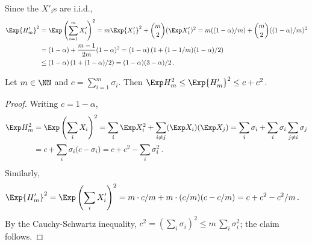 


  Since the $X'_i$s are i.i.d., 
  \begin{align*}
    \Exp {H'_m}^2 
    &= \Exp \left(\sum_{i = 1}^m X'_i \right)^2
    = m \Exp {X'_1}^2 + \binom{m}{2} (\Exp X'_1)^2
    = m ((1-\alpha)/m) + \binom{m}{2} ((1 - \alpha)/m)^2 \\
    &= (1-\alpha) + \frac{m-1}{2m} (1 - \alpha)^2
    = (1-\alpha) \left( 1 + (1 - 1/m) (1 - \alpha)/2 \right) \\
    &\leq (1-\alpha) \left( 1 + (1 - \alpha)/2 \right)
    = (1-\alpha) (3 - \alpha)/2
    \,.    
  \end{align*}


  \begin{fact}\label{fact:second-moment-equal-unequal-stake}
    Let $m \in \NN$ and $c = \sum_{i = 1}^m \sigma_i$. 
    Then $\Exp H_m^2 \leq \Exp {H'_m}^2 \leq c + c^2$.
  \end{fact}
  \begin{proof}
    Writing $c = 1 - \alpha$, 
    \begin{align*}
      \Exp H_m^2 
      &=\Exp \left(\sum_i X_i\right)^2 
      = \sum_i \Exp X_i^2 + \sum_{i \neq j} (\Exp X_i)(\Exp X_j) 
      = \sum_i \sigma_i + \sum_i \sigma_i \sum_{j \neq i} \sigma_j \\ 
      &= c + \sum_i \sigma_i (c - \sigma_i) 
      = c + c^2 - \sum_i{\sigma_i^2}
      \,.      
    \end{align*}
    Similarly,
    \begin{align*}
      \Exp {H'_m}^2 
      &=\Exp \left(\sum_i X'_i\right)^2 
      = m \cdot c/m + m \cdot (c/m) (c - c/m) 
      = c + c^2 - c^2/m
      \,.      
    \end{align*}
    By the Cauchy-Schwartz inequality, 
    $
      c^2 = \left(\sum_i \sigma_i \right)^2 \leq m \, \sum_i \sigma_i^2
    $; the claim follows.
  \end{proof}

